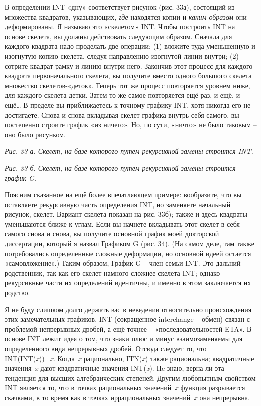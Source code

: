 \documentclass[../main.tex]{subfiles}
\begin{document}
В определении INT «дну» соответствует рисунок (рис. 33а), состоящий из множества квадратов, указывающих, \emph{где} находятся копии и \emph{каким образом} они деформированы. Я называю это «скелетом» INT\@. Чтобы построить INT на основе скелета, вы должны действовать следующим образом. Сначала для каждого квадрата надо проделать две операции: (1) вложите туда уменьшенную и изогнутую копию скелета, следуя направлению изогнутой линии внутри; (2) сотрите квадрат-рамку и линию внутри него. Закончив этот процесс для каждого квадрата первоначального скелета, вы получите вместо одного большого скелета множество скелетов-«деток». Теперь тот же процесс повторяется уровнем ниже, для каждого скелета-детки. Затем то же самое повторяется ещё раз, и ещё, и ещё\ldots{} В пределе вы приближаетесь к точному графику INT, хотя никогда его не достигаете. Снова и снова вкладывая скелет графика внутрь себя самого, вы постепенно строите график «из ничего». Но, по сути, «ничто» не было таковым \--- оно было рисунком.

\emph{Рис. 33 а. Скелет, на базе которого путем рекурсивной замены строится INT.}

\emph{Рис. 33 б. Скелет, на базе которого путем рекурсивной замены строится график G.}

Поясним сказанное на ещё более впечатляющем примере: вообразите, что вы оставляете рекурсивную часть определения INT, но заменяете начальный рисунок, скелет. Вариант скелета показан на рис. 33б); также и здесь квадраты уменьшаются ближе к углам. Если вы начнете вкладывать этот скелет в себя самого снова и снова, вы получите основной график моей докторской диссертации, который я назвал Графиком G (рис. 34). (На самом деле, там также потребовались определенные сложные деформации, но основной идеей остается «самовложение».) Таким образом, График G \--- член семьи INT\@. Это дальний родственник, так как его скелет намного сложнее скелета INT; однако рекурсивные части их определений идентичны, и именно в этом заключается их родство.

Я не буду слишком долго держать вас в неведении относительно происхождения этих замечательных графиков. INT (сокращенное interchange \--- обмен) связан с проблемой непрерывных дробей, а ещё точнее \--- «последовательностей ETA». В основе INT лежит идея о том, что знаки плюс и минус взаимозаменяемы для определенного вида непрерывных дробей. Отсюда следует то, что INT(INT(\emph{x}))=\emph{x}. Когда~\emph{x} рационально, ITN(\emph{x}) также рациональна; квадратичные значения~\emph{x} дают квадратичные значения INT(\emph{x}). He знаю, верна ли эта тенденция для высших алгебраических степеней. Другим любопытным свойством INT является то, что в точках рациональных значений~\emph{x} функция разрывается скачками, в то время как в точках иррациональных значений~\emph{x} она непрерывна.
\end{document}
